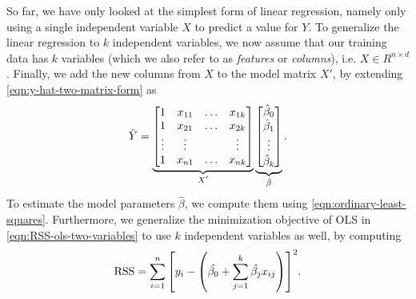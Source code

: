 So far, we have only looked at the simplest form of linear regression, namely only using a single independent variable $X$ to predict a value for $Y$. To generalize the linear regression to $k$ independent variables, we now assume that our training data has $k$ variables (which we also refer to as \textit{features} or \textit{columns}), i.e. $X \in R^{n \times d}$. Finally, we add the new columns from $X$ to the model matrix $X'$, by extending \cref{eqn:y-hat-two-matrix-form} as
\begin{align}
    \hat{Y} =
        \undertext{
        \begin{bmatrix}
            1 & x_{11} & \ldots & x_{1k} \\
            1 & x_{21} & \ldots & x_{2k} \\
            \vdots & \vdots & & \vdots \\
            1 & x_{n1} & \ldots & x_{nk} \\
        \end{bmatrix}
        }{$X'$}
        \undertext{
        \begin{bmatrix}
            \hat{\beta}_0 \\
            \hat{\beta}_1 \\
            \vdots \\
            \hat{\beta}_k \\
        \end{bmatrix}
        }{$\hat{\beta}$}.
    \label{eqn:y-hat-matrix-form-general}
\end{align}
To estimate the model parameters $\hat{\beta}$, we compute them using \cref{eqn:ordinary-least-squares}. Furthermore, we generalize the minimization objective of OLS in \cref{eqn:RSS-ols-two-variables} to use $k$ independent variables as well, by computing
\begin{align}
    \text{RSS} = \sum\limits_{i=1}^{n}{\left[y_i - \left(\hat{\beta_0} +  \sum\limits_{j=1}^{k}{\hat{\beta_j}x_{ij}}\right)\right]^2}.
    \label{eqn:RSS-ols-k-variables}
\end{align}

